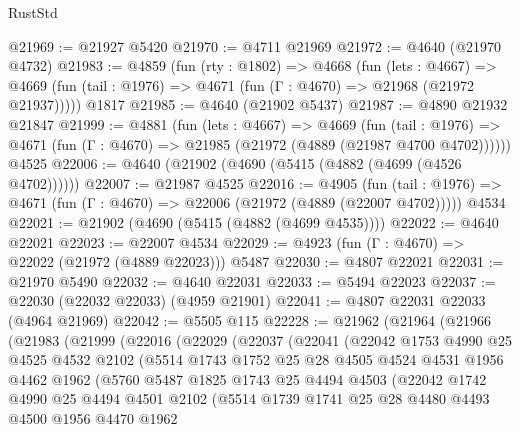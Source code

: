 \begin{lexlean}{RustStd}
\begin{coremodule}
@21969 := @21927 @5420
@21970 := @4711 @21969
@21972 := @4640 (@21970 @4732)
@21983 := @4859
    (fun (rty : @1802) =>
    @4668
      (fun (lets : @4667) =>
      @4669 (fun (tail : @1976) => @4671 (fun (Γ : @4670) => @21968 (@21972 @21937)))))
    @1817
@21985 := @4640 (@21902 @5437)
@21987 := @4890 @21932 @21847
@21999 := @4881
    (fun (lets : @4667) =>
    @4669
      (fun (tail : @1976) =>
      @4671 (fun (Γ : @4670) => @21985 (@21972 (@4889 (@21987 @4700 @4702))))))
    @4525
@22006 := @4640 (@21902 (@4690 (@5415 (@4882 (@4699 (@4526 @4702))))))
@22007 := @21987 @4525
@22016 := @4905
    (fun (tail : @1976) => @4671 (fun (Γ : @4670) => @22006 (@21972 (@4889 (@22007 @4702)))))
    @4534
@22021 := @21902 (@4690 (@5415 (@4882 (@4699 @4535))))
@22022 := @4640 @22021
@22023 := @22007 @4534
@22029 := @4923 (fun (Γ : @4670) => @22022 (@21972 (@4889 @22023))) @5487
@22030 := @4807 @22021
@22031 := @21970 @5490
@22032 := @4640 @22031
@22033 := @5494 @22023
@22037 := @22030 (@22032 @22033) (@4959 @21901)
@22041 := @4807 @22031 @22033 (@4964 @21969)
@22042 := @5505 @115
@22228 := @21962
    (@21964
      (@21966
        (@21983
          (@21999
            (@22016
              (@22029
                (@22037
                  (@22041
                    (@22042
                      @1753
                      @4990
                      @25
                      @4525
                      @4532
                      @2102
                      (@5514
                        @1743
                        @1752
                        @25
                        @28
                        @4505
                        @4524
                        @4531
                        @1956
                        @4462
                        @1962
                        (@5760
                          @5487
                          @1825
                          @1743
                          @25
                          @4494
                          @4503
                          (@22042
                            @1742
                            @4990
                            @25
                            @4494
                            @4501
                            @2102
                            (@5514
                              @1739
                              @1741
                              @25
                              @28
                              @4480
                              @4493
                              @4500
                              @1956
                              @4470
                              @1962

\end{coremodule}
\end{lexlean}
